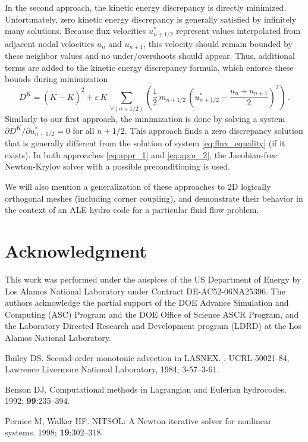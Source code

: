 \documentclass{report}
\begin{document}
In the second approach, the kinetic energy discrepancy is directly
minimized. Unfortunately, zero kinetic energy discrepancy is generally
satisfied by infinitely many solutions. Because flux velocities
$u^*_{n+1/2}$ represent values interpolated from adjacent nodal
velocities $u_{n}$ and $u_{n+1}$, this velocity should remain bounded by
these neighbor values and no under/overshoots should appear. Thus,
additional terms are added to the kinetic energy discrepancy formula,
which enforce these bounds during minimization
\begin{equation}
\label{eq:appr_2}
D^{K} = (\tilde{K} - K)^2 +
\varepsilon\, K\, \sum\limits_{\forall (n+1/2)}
\left( \frac{1}{2}\, m_{n+1/2}\, \left(
u^*_{n+1/2} - \frac{u_{n} + u_{n+1}}{2}
\right)^2 \right)
\,\mbox{.}
\end{equation}
Similarly to our first approach, the minimization is done by solving a
system $\partial D^K / \partial u^*_{n+1/2} = 0$ for all $n+1/2$. This
approach finds a zero discrepancy solution that is generally different
from the solution of system \eqref{eq:flux_equality} (if it exists). In
both approaches \eqref{eq:appr_1} and \eqref{eq:appr_2}, the
Jacobian-free Newton-Krylov solver \cite{Pernice_Walker:NITSOL} with a
possible preconditioning is used.

We will also mention a generalization of these approaches to 2D
logically orthogonal meshes (including corner coupling), and demonstrate
their behavior in the context of an ALE hydro code for a particular fluid
flow problem.

\section*{Acknowledgment}
This work was performed under the auspices of the US Department of Energy
by Los Alamos National Laboratory under Contract
DE-AC52-06NA25396. The authors acknowledge the partial support of the DOE
Advance Simulation and Computing (ASC) Program and the DOE Office of
Science ASCR Program, and the Laboratory Directed Research and
Development program (LDRD) at the Los Alamos National Laboratory.

\begin{thebibliography}{9}

Bailey DS.
\newblock Second-order monotonic advection in LASNEX.
.
\newblock UCRL-50021-84, Lawrence Livermore National Laboratory,
1984; 3-57--3-61.

Benson DJ.
\newblock Computational methods in Lagrangian and Eulerian hydrocodes.
 1992;
{\bf 99}:235--394.

Pernice M, Walker HF.
\newblock NITSOL: A Newton iterative solver for nonlinear systems.
 1998;
{\bf 19}:302--318.

\end{thebibliography}
\end{document}
